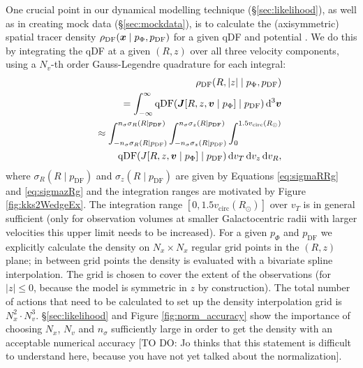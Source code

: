 One crucial point in our dynamical modelling technique (\S\ref{sec:likelihood}), as well as in creating mock data (\S\ref{sec:mockdata}), is to calculate the (axisymmetric) spatial tracer density $\rho_\text{DF}(\boldsymbol{x} \mid p_{\Phi},p_\text{DF})$ for a given qDF and potential . We do this by integrating the qDF at a given $(R,z)$ over all three velocity components, using a $N_v$-th order Gauss-Legendre quadrature for each integral:
\begin{eqnarray}
&&\rho_\text{DF}(R,|z| \mid p_{\Phi},p_\text{DF}) \nonumber\\
&&= \int_{-\infty}^{\infty} \text{qDF}(\boldsymbol{J}[R,z,\boldsymbol{v} \mid p_{\Phi}] \mid p_\text{DF}) \mathop{}\!\mathrm{d^3}\boldsymbol{v}  \label{eq:tracerdensity_general}\\
&&\approx \int_{-n_\sigma \sigma_R(R \mid p_\text{DF})}^{n_\sigma \sigma_R(R \mid p_\text{DF})} \int_{-n_\sigma\sigma_z(R \mid p_\text{DF})}^{n_\sigma \sigma_z(R \mid p_\text{DF})} \int_{0}^{1.5 v_\text{circ}(R_\odot)}  \nonumber\\
& & \hspace{1cm} \text{qDF}(J[R,z,\boldsymbol{v} \mid p_{\Phi}] \mid p_\text{DF}) \mathop{}\!\mathrm{d} v_T \mathop{}\!\mathrm{d} v_z \mathop{}\!\mathrm{d} v_R, \label{eq:tracerdensity}
\end{eqnarray}
where $\sigma_R(R \mid p_\text{DF})$ and $\sigma_z(R \mid p_\text{DF})$ are given by Equations \ref{eq:sigmaRRg} and \ref{eq:sigmazRg} and the integration ranges are motivated by Figure \ref{fig:kks2WedgeEx}. The integration range $[0,1.5 v_\text{circ}(R_\odot)]$ over $v_T$ is in general sufficient (only for observation volumes at smaller Galactocentric radii with larger velocities this upper limit needs to be increased). For a given $p_\Phi$ and $p_\text{DF}$ we explicitly calculate the density on $N_x \times N_x$ regular grid points in the $(R,z)$ plane; in between grid points the density is evaluated with a bivariate spline interpolation. The grid is chosen to cover the extent of the observations (for $|z|\leq0$, because the model is symmetric in $z$ by construction). The total number of actions that need to be calculated to set up the density interpolation grid is $N_x^2 \cdot N_v^3$. \S\ref{sec:likelihood} and Figure \ref{fig:norm_accuracy} show the importance of choosing $N_x$, $N_v$ and $n_\sigma$ sufficiently large in order to get the density with an acceptable numerical accuracy [TO DO: Jo thinks that this statement is difficult to understand here, because you have not yet talked about the normalization]. 



